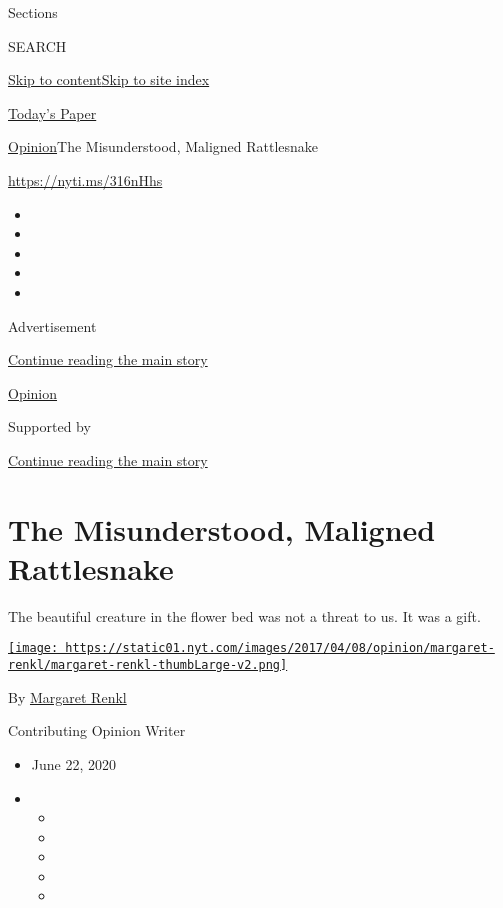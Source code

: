 Sections

SEARCH

\protect\hyperlink{site-content}{Skip to
content}\protect\hyperlink{site-index}{Skip to site index}

\href{https://myaccount.nytimes.com/auth/login?response_type=cookie\&client_id=vi}{}

\href{https://www.nytimes.com/section/todayspaper}{Today's Paper}

\href{/section/opinion}{Opinion}\textbar{}The Misunderstood, Maligned
Rattlesnake

\href{https://nyti.ms/316nHhs}{https://nyti.ms/316nHhs}

\begin{itemize}
\item
\item
\item
\item
\item
\end{itemize}

Advertisement

\protect\hyperlink{after-top}{Continue reading the main story}

\href{/section/opinion}{Opinion}

Supported by

\protect\hyperlink{after-sponsor}{Continue reading the main story}

\hypertarget{the-misunderstood-maligned-rattlesnake}{%
\section{The Misunderstood, Maligned
Rattlesnake}\label{the-misunderstood-maligned-rattlesnake}}

The beautiful creature in the flower bed was not a threat to us. It was
a gift.

\href{https://www.nytimes.com/by/margaret-renkl}{\texttt{[image: https://static01.nyt.com/images/2017/04/08/opinion/margaret-renkl/margaret-renkl-thumbLarge-v2.png]}}

By \href{https://www.nytimes.com/by/margaret-renkl}{Margaret Renkl}

Contributing Opinion Writer

\begin{itemize}
\item
  June 22, 2020
\item
  \begin{itemize}
  \item
  \item
  \item
  \item
  \item
  \end{itemize}
\end{itemize}

